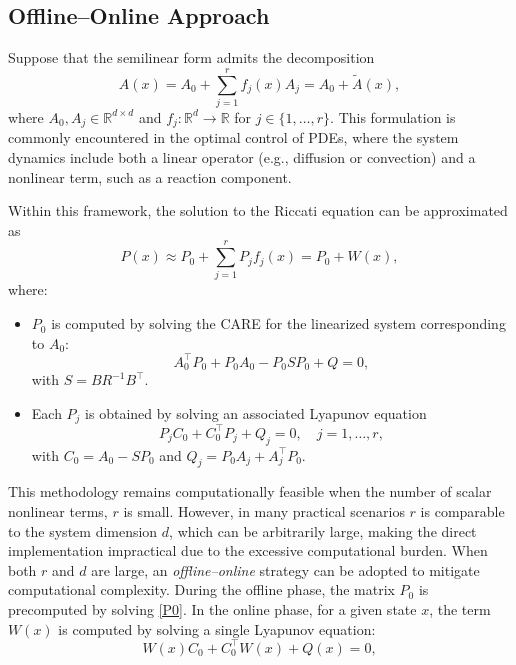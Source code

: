 \documentclass{article}
\begin{document}
\subsection{Offline–Online Approach}

Suppose that the semilinear form admits the decomposition
\begin{equation}
  A(x) = A_0 + \sum_{j=1}^{r} f_j(x) A_j = A_0 + \tilde{A}(x),
  \label{eq:A_decomp}
\end{equation}
where $A_0,A_j \in \mathbb{R}^{d \times d}$ and $f_j: \mathbb{R}^d \rightarrow \mathbb{R}$ for $j \in \{1,\dots, r\}$. This formulation is commonly encountered in the optimal control of PDEs, where the system dynamics include both a linear operator (e.g., diffusion or convection) and a nonlinear term, such as a reaction component.

Within this framework, the solution to the Riccati equation can be approximated as
\begin{equation}
  P(x) \approx P_0 + \sum_{j=1}^{r} P_j f_j(x) = P_0 + W(x),
  \label{eq:pi_approx}
\end{equation}
where:
\begin{itemize}
  \item \(P_0\) is computed by solving the CARE for the linearized system corresponding to \(A_0\):
    \begin{equation}
    A_0^\top P_0 + P_0 A_0 - P_0 S P_0 + Q = 0,
    \label{P0}
        \end{equation}
    with $
    S = B R^{-1}B^\top.
   $
  \item Each \(P_j\) is obtained by solving an associated Lyapunov equation
    \[
    P_j C_0 + C_0^\top P_j + Q_j = 0, \quad j=1,\ldots,r,
    \]
    with \(C_0 = A_0 - SP_0\) and \(Q_j = P_0 A_j + A_j^\top P_0\).
\end{itemize}




This methodology remains computationally feasible when the number of scalar nonlinear terms, $r$ is small. However, in many practical scenarios $r$ is comparable to the system dimension $d$, which can be arbitrarily large, making the direct implementation impractical due to the excessive computational burden.
When both $r$ and $d$ are large, an \emph{offline–online} strategy can be adopted to mitigate computational complexity. During the offline phase, the matrix $P_0$ is precomputed by solving \eqref{P0}. In the online phase, for a given state \(x\), the term $W(x)$ is computed by solving a single Lyapunov equation:
\begin{equation}
  W(x) C_0 + C_0^\top W(x) + Q(x) = 0,
  \label{eq:W_lyap}
\end{equation}
\end{document}

